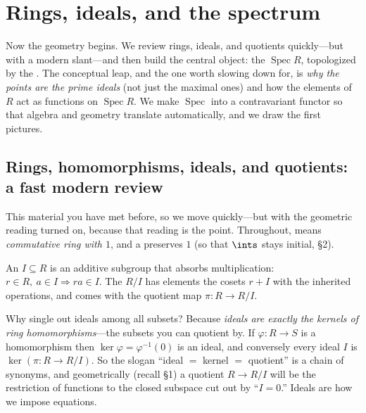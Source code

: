 \documentclass[11pt]{article}
\DeclareMathOperator{\Spec}{Spec}
\begin{document}
\section{Rings, ideals, and the spectrum}

\noindent
Now the geometry begins. We review rings, ideals, and quotients quickly---but with a modern
slant---and then build the central object: the  $\Spec R$, topologized
by the . The conceptual leap, and the one worth slowing down for,
is \emph{why the points are the prime ideals} (not just the maximal ones) and how the
elements of $R$ act as functions on $\Spec R$. We make $\Spec$ into a contravariant functor
so that algebra and geometry translate automatically, and we draw the first pictures.

\subsection{Rings, homomorphisms, ideals, and quotients: a fast modern review}

This material you have met before, so we move quickly---but with the geometric reading turned
on, because that reading is the point. Throughout,  means \emph{commutative ring
with $1$}, and a  preserves $1$ (so that $\ints$ stays initial, \S2).

\begin{ddefinition}
An  $I\subseteq R$ is an additive subgroup that absorbs multiplication:
$r\in R,\ a\in I \Rightarrow ra\in I$. The  $R/I$ has elements the cosets
$r+I$ with the inherited operations, and comes with the quotient map $\pi\colon R\to R/I$.
\end{ddefinition}

Why single out ideals among all subsets? Because \emph{ideals are exactly the kernels of ring
homomorphisms}---the subsets you can quotient by. If $\varphi\colon R\to S$ is a homomorphism
then $\ker\varphi=\varphi^{-1}(0)$ is an ideal, and conversely every ideal $I$ is
$\ker(\pi\colon R\to R/I)$. So the slogan ``ideal $=$ kernel $=$ quotient'' is a chain of
synonyms, and geometrically (recall \S1) a quotient $R\to R/I$ will be the restriction of
functions to the closed subspace cut out by ``$I=0$.'' Ideals are how we impose equations.
\end{document}
